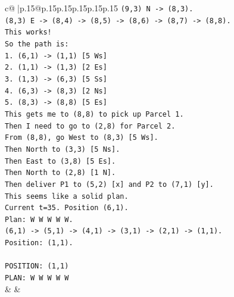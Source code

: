 \documentclass{article}
\begin{document}
{\begin{supertabular}{c@{$\;$}|p{.15\linewidth}@{}p{.15\linewidth}p{.15\linewidth}p{.15\linewidth}p{.15\linewidth}p{.15\linewidth}}
{{{\texttt{(9,3) N {-}> (8,3).} \\
\texttt{(8,3) E {-}> (8,4) {-}> (8,5) {-}> (8,6) {-}> (8,7) {-}> (8,8).} \\
\texttt{This works!} \\
\texttt{So the path is:} \\
\texttt{1. (6,1) {-}> (1,1) {[}5 Ws{]}} \\
\texttt{2. (1,1) {-}> (1,3) {[}2 Es{]}} \\
\texttt{3. (1,3) {-}> (6,3) {[}5 Ss{]}} \\
\texttt{4. (6,3) {-}> (8,3) {[}2 Ns{]}} \\
\texttt{5. (8,3) {-}> (8,8) {[}5 Es{]}} \\
\texttt{This gets me to (8,8) to pick up Parcel 1.} \\
\texttt{Then I need to go to (2,8) for Parcel 2.} \\
\texttt{From (8,8), go West to (8,3) {[}5 Ws{]}.} \\
\texttt{Then North to (3,3) {[}5 Ns{]}.} \\
\texttt{Then East to (3,8) {[}5 Es{]}.} \\
\texttt{Then North to (2,8) {[}1 N{]}.} \\
\texttt{Then deliver P1 to (5,2) {[}x{]} and P2 to (7,1) {[}y{]}.} \\
\texttt{This seems like a solid plan.} \\
\texttt{Current t=35. Position (6,1).} \\
\texttt{Plan: W W W W W.} \\
\texttt{(6,1) {-}> (5,1) {-}> (4,1) {-}> (3,1) {-}> (2,1) {-}> (1,1).} \\
\texttt{Position: (1,1).} \\
\\ 
\texttt{POSITION: (1,1)} \\
\texttt{PLAN: W W W W W} \\
            }
        }
    }
    & & \\ \\


\end{supertabular}}
\end{document}

